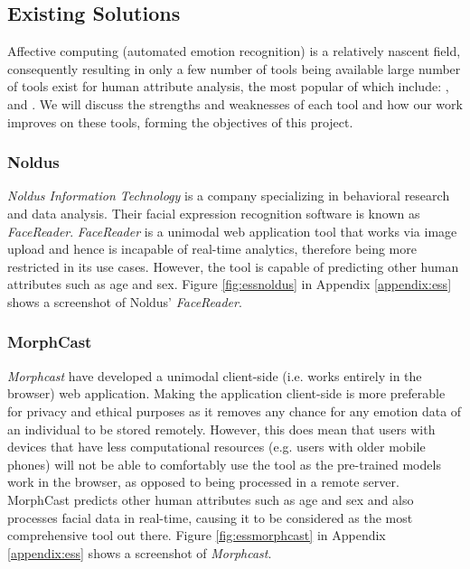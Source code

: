 \documentclass[12pt, a4paper]{article}
\begin{document}
\subsection{Existing Solutions}
\label{es}

Affective computing (automated emotion recognition) is a relatively nascent field, consequently resulting in only a few number of tools being available large number of tools exist for human attribute analysis, the most popular of which include: \cite{noldus}, \cite{morphcast} and \cite{imotions}. We will discuss the strengths and weaknesses of each tool and how our work improves on these tools, forming the objectives of this project.

\subsubsection{Noldus}

\textit{Noldus Information Technology} is a company specializing in behavioral research and data analysis. Their facial expression recognition software is known as \textit{FaceReader}. \textit{FaceReader} is a unimodal web application tool that works via image upload and hence is incapable of real-time analytics, therefore being more restricted in its use cases. However, the tool is capable of predicting other human attributes such as age and sex. Figure \ref{fig:essnoldus} in Appendix \ref{appendix:ess} shows a screenshot of Noldus' \textit{FaceReader}.

\subsubsection{MorphCast}

\textit{Morphcast} have developed a unimodal client-side (i.e. works entirely in the browser) web application. Making the application client-side is more preferable for privacy and ethical purposes as it removes any chance for any emotion data of an individual to be stored remotely. However, this does mean that users with devices that have less computational resources (e.g. users with older mobile phones) will not be able to comfortably use the tool as the pre-trained models work in the browser, as opposed to being processed in a remote server. MorphCast predicts other human attributes such as age and sex and also processes facial data in real-time, causing it to be considered as the most comprehensive tool out there. Figure \ref{fig:essmorphcast} in Appendix \ref{appendix:ess} shows a screenshot of \textit{Morphcast}.
\end{document}
